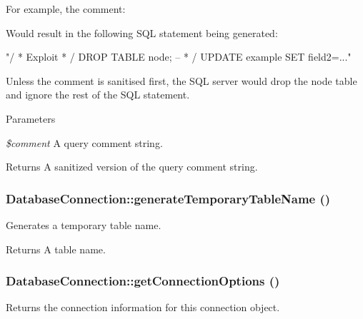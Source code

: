 For example, the comment: 


Would result in the following SQL statement being generated: 
\begin{DoxyCode}
 "/ * Exploit * / DROP TABLE node; -- * / UPDATE example SET field2=..."
\end{DoxyCode}


Unless the comment is sanitised first, the SQL server would drop the node table and ignore the rest of the SQL statement.


\begin{DoxyParams}{Parameters}
\item[{\em \$comment}]A query comment string.\end{DoxyParams}
\begin{DoxyReturn}{Returns}
A sanitized version of the query comment string. 
\end{DoxyReturn}
\hypertarget{classDatabaseConnection_a8726459b0a9478a9a80d36237fa3ba30}{
\subsubsection[{generateTemporaryTableName}]{\setlength{\rightskip}{0pt plus 5cm}DatabaseConnection::generateTemporaryTableName ()}}
\label{classDatabaseConnection_a8726459b0a9478a9a80d36237fa3ba30}
Generates a temporary table name.

\begin{DoxyReturn}{Returns}
A table name. 
\end{DoxyReturn}
\hypertarget{classDatabaseConnection_afd8209665716f8866a799ddf2e985d1b}{
\subsubsection[{getConnectionOptions}]{\setlength{\rightskip}{0pt plus 5cm}DatabaseConnection::getConnectionOptions ()}}
\label{classDatabaseConnection_afd8209665716f8866a799ddf2e985d1b}
Returns the connection information for this connection object.

